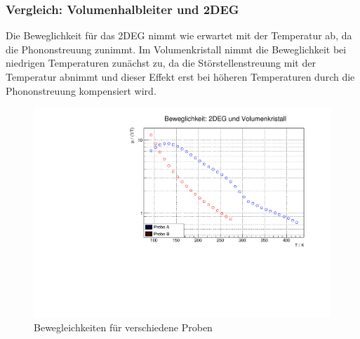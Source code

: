 \subsubsection{Vergleich: Volumenhalbleiter und 2DEG}
\FloatBarrier

Die Beweglichkeit für das 2DEG nimmt wie erwartet mit der Temperatur ab, da die Phononstreuung zunimmt. Im Volumenkristall nimmt die Beweglichkeit bei niedrigen Temperaturen zunächst zu, da die Störstellenstreuung mit der Temperatur abnimmt und dieser Effekt erst bei höheren Temperaturen durch die Phononstreuung kompensiert wird.

\begin{figure}
\label{fig:bbew}
\centering
\includegraphics[scale = 0.5]{../data/B2.pdf}
\caption{Bewegleichkeiten für verschiedene Proben}
\end{figure}







